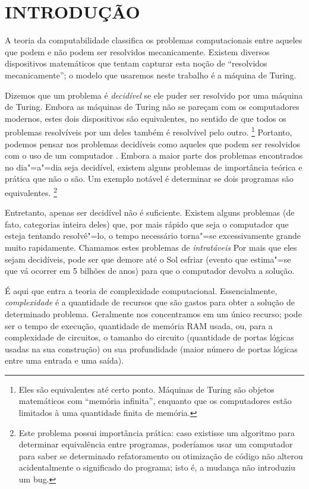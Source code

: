 \chapter{INTRODUÇÃO}

A teoria da computabilidade
classifica os problemas computacionais entre
aqueles que podem e não podem ser resolvidos mecanicamente.
Existem diversos dispositivos matemáticos
que tentam capturar esta noção de
``resolvidos mecanicamente'';
o modelo que usaremos neste trabalho é a máquina de Turing.

Dizemos que um problema é \emph{decidível}
se ele puder ser resolvido por uma máquina de Turing.
Embora as máquinas de Turing
não se pareçam com os computadores modernos,
estes dois dispositivos são equivalentes,
no sentido de que
todos os problemas resolvíveis por um deles
também é resolvível pelo outro.
\footnote{
    Eles são equivalentes até certo ponto.
    Máquinas de Turing são objetos matemáticos
    com ``memória infinita'',
    enquanto que os computadores estão limitados
    à uma quantidade finita de memória.
}
Portanto, podemos pensar nos problemas decidíveis
como aqueles que podem ser resolvidos com o uso de um computador
\cite[p. 307]{HopcroftMotwaniUllman2001}.
Embora a maior parte dos problemas
encontrados no dia"=a"=dia seja decidível,
existem alguns problemas de importância teórica e prática
que não o são.
Um exemplo notável é determinar se dois programas são equivalentes.
\footnote{
    Este problema possui importância prática:
    caso existisse um algoritmo para determinar equivalência entre programas,
    poderíamos usar um computador para saber se
    determinado refatoramento ou otimização de código
    não alterou acidentalmente o significado do programa;
    isto é, a mudança não introduziu um bug.
}

Entretanto,
apenas ser decidível não é suficiente.
Existem alguns problemas
(de fato, categorias inteira deles)
que, por mais rápido que seja o computador
que esteja tentando resolvê"=lo,
o tempo necessário torna"=se excessivamente grande
muito rapidamente.
Chamamos estes problemas de \emph{intratáveis}
\cite[p. 1]{HopcroftMotwaniUllman2001}
Por mais que eles sejam decidíveis,
pode ser que demore até o Sol esfriar
(evento que estima"=se que vá ocorrer em 5 bilhões de anos)
para que o computador devolva a solução.

É aqui que entra a teoria de complexidade computacional.
Essencialmente,
\emph{complexidade}
é a quantidade de recursos que são gastos
para obter a solução de determinado problema.
Geralmente nos concentramos em um único recurso;
pode ser o tempo de execução,
quantidade de memória RAM usada,
ou,
para a complexidade de circuitos,
o tamanho do circuito
(quantidade de portas lógicas usadas na sua construção)
ou sua profundidade
(maior número de portas lógicas entre uma entrada e uma saída).

